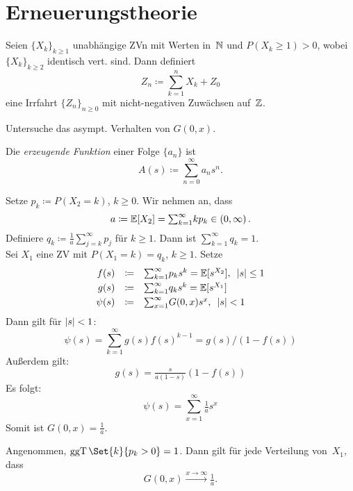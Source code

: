\documentclass{cheat-sheet}
\newcommand{\E}{\mathbb{E}} %
\DeclareMathOperator{\ggT}{ggT} %
\begin{document}

\section{Erneuerungstheorie}

\begin{situation}
  Seien $\{ X_k \}_{k \geq 1}$ unabhängige ZVn mit Werten in~$\mathbb{N}$ und $P(X_k \geq 1) > 0$, wobei $\{ X_k \}_{k \geq 2}$ identisch vert. sind.
  Dann definiert
  \[
  Z_n \coloneqq {\sum}_{k=1}^n X_k + Z_0
  \]
  eine Irrfahrt $\{ Z_n \}_{n \geq 0}$ mit nicht-negativen Zuwächsen auf~$\mathbb{Z}$.
\end{situation}

\begin{ziel}
  Untersuche das asympt. Verhalten von $G(0, x)$.
\end{ziel}

\begin{defn}
  Die \emph{erzeugende Funktion} einer Folge $\{ a_n \}$ ist
  \[ A(s) \coloneqq {\sum}_{n=0}^\infty a_n s^n. \]
\end{defn}

\begin{bsp}
  Setze $p_k \coloneqq P(X_2 = k)$, $k \geq 0$.
  Wir nehmen an, dass
  \[ a \coloneqq \E[X_2] = {\sum}_{k=1}^\infty k p_k \in \ointerval{0}{\infty}. \]
  Definiere
  $q_k \coloneqq \tfrac{1}{a} {\sum}_{j=k}^\infty p_j$
  für $k \geq 1$.
  Dann ist ${\sum}_{k=1}^\infty q_k = 1$. \\
  Sei $X_1$ eine ZV mit $P(X_1=k) = q_k$, $k \geq 1$.
  Setze
  \[
    \begin{array}{r c l}
      f(s) &\coloneqq& {\sum}_{k=1}^\infty p_k s^k = \E[s^{X_2}], \enspace \abs{s} \leq 1 \\[0.1cm]
      g(s) &\coloneqq& {\sum}_{k=1}^\infty q_k s^k = \E[s^{X_1}] \\[0.1cm]
      \psi(s) &\coloneqq& {\sum}_{x=1}^\infty G(0, x) s^x, \enspace \abs{s} < 1
    \end{array}
  \]
  Dann gilt für $\lvert s\rvert < 1$:
  \[ \psi(s) = {\sum}_{k=1}^\infty g(s) f(s)^{k-1} = g(s)/(1 - f(s)) \]
  Außerdem gilt:
  \[ g(s) = \tfrac{s}{a (1-s)} (1 - f(s)) \]
  Es folgt:
  \[ \psi(s) = \sum_{x=1}^\infty \tfrac{1}{a} s^x \]
  Somit ist $G(0, x) = \tfrac{1}{a}$.
\end{bsp}

\begin{satz}
  Angenommen, $\ggT \Set{k}{p_k > 0} = 1$.
  Dann gilt für jede Verteilung von~$X_1$, dass
  \[ G(0, x) \xrightarrow{x \to \infty} \tfrac{1}{a}. \]
\end{satz}
\end{document}
